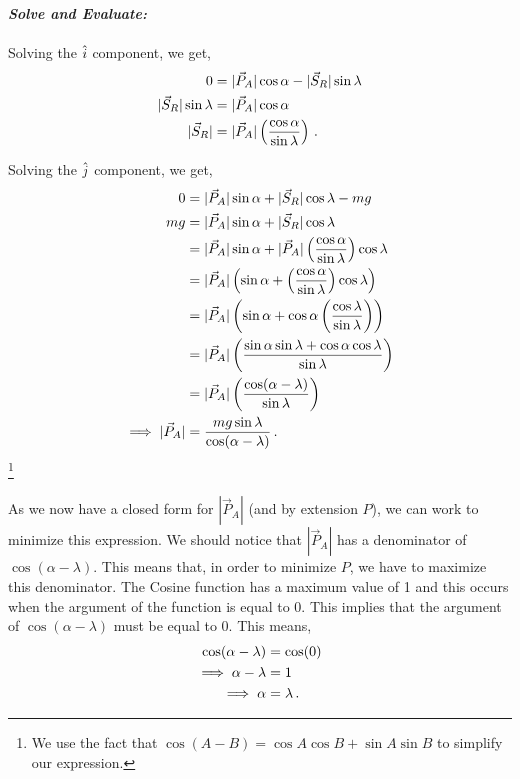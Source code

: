 \begin{subquestions}
\begin{subsubquestions}
	\textbf{\textit{Solve and Evaluate:}} \\ \\
	Solving the $\hat{i}$ component, we get,
	\begin{align}
		0 & = |\vec{P}_{A}|\cos{\alpha} - |\vec{S}_{R}|\sin{\lambda} \nonumber \\
		|\vec{S}_{R}|\sin{\lambda} & = |\vec{P}_{A}|\cos{\alpha} \nonumber \\
		|\vec{S}_{R}| & = |\vec{P}_{A}| \left(\frac{\cos{\alpha}}{\sin{\lambda}}\right) \,.
	\end{align}
	
	Solving the $\hat{j}$ component, we get,
	\begin{align}
		0 & = |\vec{P}_{A}|\sin{\alpha} + |\vec{S}_{R}|\cos{\lambda} - mg \nonumber \\
		mg & = |\vec{P}_{A}|\sin{\alpha} + |\vec{S}_{R}|\cos{\lambda} \nonumber \\
		 & = |\vec{P}_{A}|\sin{\alpha} + |\vec{P}_{A}|\left(\frac{\cos{\alpha}}{\sin{\lambda}}\right)\cos{\lambda} \nonumber \\
		 & = |\vec{P}_{A}|\left(\sin{\alpha} + \left(\frac{\cos{\alpha}}{\sin{\lambda}}\right)\cos{\lambda}\right) \nonumber \\
		 & = |\vec{P}_{A}|\left(\sin{\alpha} + \cos{\alpha}\left(\frac{\cos{\lambda}}{\sin{\lambda}}\right)\right) \nonumber \\
		 & = |\vec{P}_{A}|\left(\frac{\sin{\alpha}\sin{\lambda}+\cos{\alpha}\cos{\lambda}}{\sin{\lambda}}\right) \nonumber \\
		 & = |\vec{P}_{A}|\left(\frac{\cos(\alpha - \lambda)}{\sin{\lambda}}\right) \nonumber \\
		\implies |\vec{P}_{A}| & = \frac{mg \sin{\lambda}}{\cos(\alpha-\lambda)} \,.
	\end{align} \footnote{We use the fact that $\cos(A-B)=\cos{A}\cos{B} + \sin{A}\sin{B}$ to simplify our expression.}

	As we now have a closed form for $|\vec{P}_{A}|$ (and by extension $P$), we can work to minimize this expression. We should notice that $|\vec{P}_{A}|$ has a denominator of $\cos(\alpha - \lambda)$. This means that, in order to minimize $P$, we have to maximize this denominator. The Cosine function has a maximum value of 1 and this occurs when the argument of the function is equal to 0. This implies that the argument of $\cos(\alpha - \lambda)$ must be equal to 0. This means,
	\begin{align}
		\cos(\alpha - \lambda) & = \cos(0) \nonumber \\
		\implies \alpha - \lambda & = 1 \nonumber \\
		\implies \alpha & = \lambda \,.
	\end{align}
	

\end{subsubquestions}
\end{subquestions}
